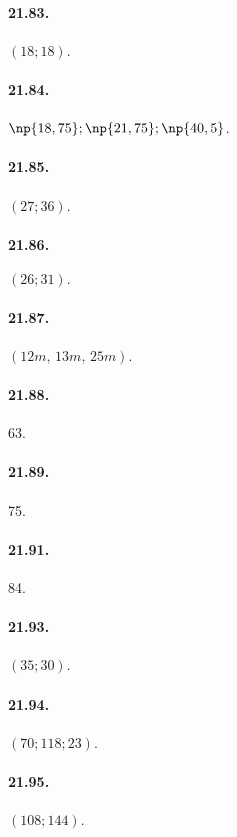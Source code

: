 \begin{multicols}{2}

\paragraph{21.83.} $(18;18)$.

\paragraph{21.84.} $\np{18,75}; \np{21,75}; \np{40,5}$.

\paragraph{21.85.} $(27;36)$.

\paragraph{21.86.} $(26;31).$

\paragraph{21.87.} $(12\unit{m}\text{,~}13\unit{m}\text{,~}25\unit{m})$.

\paragraph{21.88.} 63.

\paragraph{21.89.} 75.

\paragraph{21.91.} 84.

\paragraph{21.93.} $(35;30)$.

\paragraph{21.94.} $(70;118;23)$.

\paragraph{21.95.} $(108;144)$.


\end{multicols}
